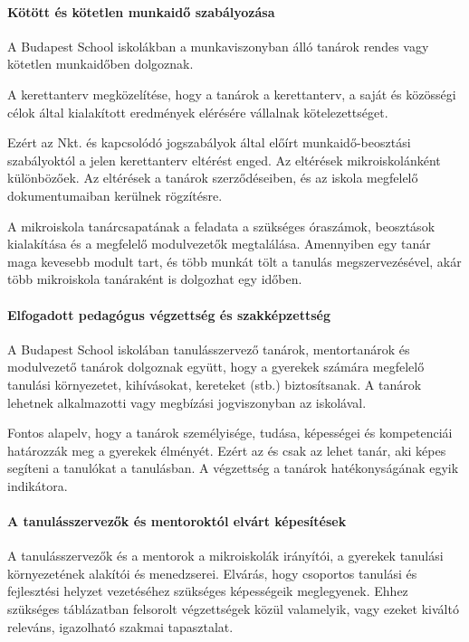 \paragraph{Kötött és kötetlen munkaidő szabályozása}

A Budapest School iskolákban a munkaviszonyban álló tanárok rendes vagy kötetlen
munkaidőben dolgoznak.

A kerettanterv megközelítése, hogy a tanárok a kerettanterv, a saját és közösségi
célok által kialakított eredmények elérésére vállalnak kötelezettséget.

Ezért az Nkt. és kapcsolódó jogszabályok által előírt munkaidő-beosztási szabályoktól a jelen kerettanterv eltérést enged. Az eltérések mikroiskolánként különbözőek. Az eltérések a tanárok szerződéseiben, és az iskola megfelelő dokumentumaiban kerülnek rögzítésre.

A mikroiskola tanárcsapatának a
feladata a szükséges óraszámok, beosztások kialakítása és a megfelelő
modulvezetők megtalálása. Amennyiben egy tanár maga kevesebb modult tart, és
több munkát tölt a tanulás megszervezésével, akár több mikroiskola tanáraként
is dolgozhat egy időben.

\paragraph{Elfogadott pedagógus végzettség és szakképzettség}

A Budapest School iskolában tanulásszervező tanárok, mentortanárok és
modulvezető tanárok dolgoznak együtt, hogy a gyerekek számára megfelelő
tanulási környezetet, kihívásokat, kereteket (stb.) biztosítsanak. A tanárok
lehetnek alkalmazotti vagy megbízási jogviszonyban az iskolával.

Fontos alapelv, hogy a tanárok személyisége, tudása, képességei és
kompetenciái határozzák meg a gyerekek élményét.  Ezért az és csak az lehet
tanár, aki képes segíteni a tanulókat a
tanulásban. A végzettség a tanárok hatékonyságának egyik indikátora.

\paragraph{A tanulásszervezők és mentoroktól elvárt képesítések} A
tanulásszervezők és a mentorok a mikroiskolák irányítói, a gyerekek tanulási
környezetének alakítói és menedzserei. Elvárás, hogy csoportos tanulási és
fejlesztési helyzet vezetéséhez szükséges képességeik meglegyenek. Ehhez
szükséges  táblázatban felsorolt végzettségek közül
valamelyik, vagy ezeket kiváltó
releváns, igazolható szakmai tapasztalat.

